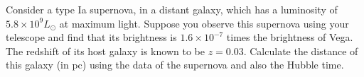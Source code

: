 Consider a type Ia supernova, in a distant galaxy, which has a luminosity of
$5.8 \times 10^{9}L_\odot$ at maximum light. Suppose you observe this
supernova using your telescope and find that its brightness is
$1.6 \times 10^{-7}$ times the brightness of Vega. The redshift of its host
galaxy is known to be $z = 0.03$. Calculate the distance of this galaxy (in
pc) using the data of the supernova and also the Hubble time.
